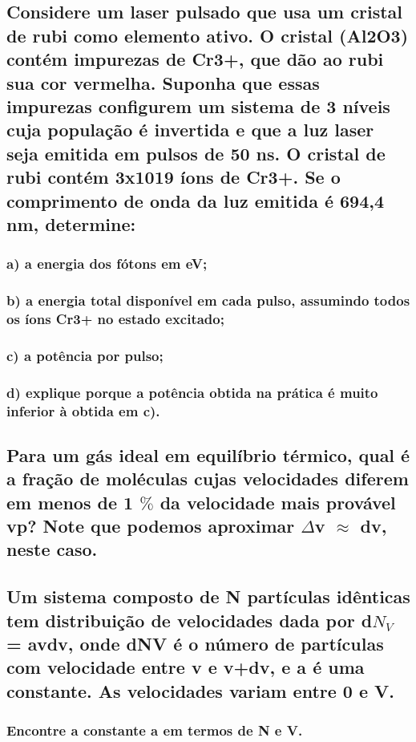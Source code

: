 \documentclass{article}
\begin{document}
\subsection{Considere um laser pulsado que usa um cristal de rubi como elemento ativo. O cristal (Al2O3) contém impurezas de Cr3+, que dão ao rubi sua cor vermelha. Suponha que essas impurezas configurem um sistema de 3 níveis cuja população é invertida e que a luz laser seja emitida em pulsos de 50 ns. O cristal de rubi contém 3x1019 íons de Cr3+. Se o comprimento de onda da luz emitida é 694,4 nm, determine:}
\subsubsection{a) a energia dos fótons em eV;}

\subsubsection{b) a energia total disponível em cada pulso, assumindo todos os íons Cr3+ no estado excitado;}

\subsubsection{c) a potência por pulso; }

\subsubsection{d) explique porque a potência obtida na prática é muito inferior à obtida em c).}


\subsection{Para um gás ideal em equilíbrio térmico, qual é a fração de moléculas cujas velocidades diferem em menos de 1 $\%$ da velocidade mais provável vp? Note que podemos aproximar $\Delta$v $\approx$ dv, neste caso.}

\subsection{Um sistema composto de N partículas idênticas tem distribuição de velocidades dada por  d$N_V$  = avdv, onde dNV é o número de partículas com velocidade entre v e v+dv, e a é uma constante. As velocidades variam entre 0 e V.
}
\subsubsection{Encontre a constante a em termos de N e V. 
}
\end{document}
